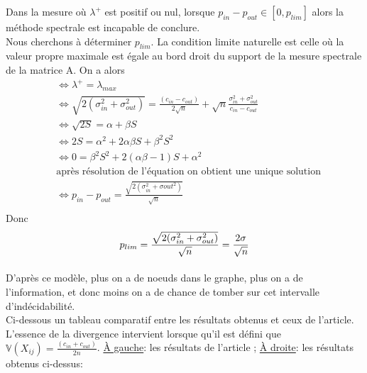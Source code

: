 Dans la mesure où  $\lambda^+$ est positif ou nul, lorsque $p_{in} - p_{out} \in [0, p_{lim}]$ alors la méthode spectrale est incapable de conclure.\\
 
Nous cherchons à déterminer $p_{lim}$.
La condition limite naturelle est celle où la valeur propre maximale est égale au bord droit du support de la mesure spectrale de la matrice A.
On a alors 
\begin{align*}
	&\Leftrightarrow \lambda^+ = \lambda_{max}\\
	&\Leftrightarrow \sqrt{2(\sigma_{in}^2 + \sigma_{out}^2)} = \frac{(c_{in} - c_{out})}{2\sqrt{n}} + \sqrt{n}\frac{\sigma_{in}^2 + \sigma_{out}^2}{c_{in} - c_{out}}\\
	&\Leftrightarrow \sqrt{2S} = \alpha + \beta S\\
	&\Leftrightarrow 2S = \alpha^2 + 2\alpha \beta S +\beta^2 S^2\\
	&\Leftrightarrow 0 = \beta^2 S^2 + 2(\alpha \beta - 1)S+ \alpha^2 \\
	&\text{après résolution de l'équation on obtient une unique solution}\\
	&\Leftrightarrow p_{in} - p_{out} = \frac{\sqrt{2(\sigma_{in}^2 + \sigma{out}^2)}}{\sqrt{n}}  \\
\end{align*}
Donc
\begin{equation}
	p_{lim} = \frac{\sqrt{2(\sigma_{in}^2 + \sigma_{out}^2)}}{\sqrt{n}}= \frac{2\sigma}{\sqrt{n}}  \\
\end{equation}

\paragraph{}\label{rq:ngrand}
D'après ce modèle, plus on a de noeuds dans le graphe, plus on a de l'information, et donc moins on a de chance de tomber sur cet intervalle d’indécidabilité.\\

Ci-dessous un tableau comparatif entre les résultats obtenus et ceux de l'article.
L'essence de la divergence intervient lorsque qu'il est défini que $\mathbb{V}(X_{ij}) = \frac{(c_{in} + c_{out})}{2n}$.
\underline{À gauche}: les résultats de l'article ; \underline{À droite}: les résultats obtenus ci-dessus:

